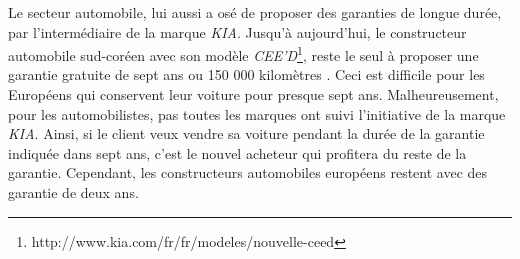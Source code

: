 \smallbreak
Le secteur automobile, lui aussi a osé de proposer des garanties de longue durée, par l’intermédiaire de la marque \textit{KIA}. Jusqu’à aujourd'hui, le constructeur automobile sud-coréen avec son modèle \textit{CEE’D}\footnote{http://www.kia.com/fr/fr/modeles/nouvelle-ceed}, reste le seul à proposer une garantie gratuite de sept ans ou 150 000 kilomètres \cite{kia}. Ceci est difficile pour les Européens qui conservent leur voiture pour presque sept ans. Malheureusement, pour les automobilistes, pas toutes les marques ont suivi l’initiative de la marque \textit{KIA}. Ainsi, si le client veux vendre sa voiture pendant la durée de la garantie indiquée dans sept ans, c'est le nouvel acheteur qui profitera du reste de la garantie. Cependant, les constructeurs automobiles européens restent avec des garantie de deux ans.


